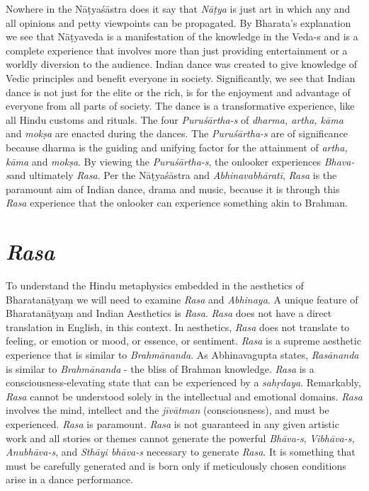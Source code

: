 Nowhere in the Nāṭyaśāstra does it say that \textit{Nāṭya} is just art in which any and all opinions and petty viewpoints can be propagated. By Bharata’s explanation we see that Nāṭyaveda is a manifestation of the knowledge in the Veda-s and is a complete experience that involves more than just providing entertainment or a worldly diversion to the audience. Indian dance was created to give knowledge of Vedic principles and benefit everyone in society. Significantly, we see that Indian dance is not just for the elite or the rich, is for the enjoyment and advantage of everyone from all parts of society. The dance is a transformative experience, like all Hindu customs and rituals. The four \textit{Puruśārtha-s} of \textit{dharma, artha, kāma }and \textit{mokṣa} are enacted during the dances. The \textit{Puruśārtha-s} are of significance because dharma is the guiding and unifying factor for the attainment of \textit{artha, kāma }and \textit{mokṣa}. By viewing the \textit{Puruśārtha-s}, the onlooker experiences \textit{Bhava-s}\break and ultimately \textit{Rasa}. Per the Nāṭyaśāstra and \textit{Abhinavabhāratī}, \textit{Rasa} is the paramount aim of Indian dance, drama and music, because it is through this \textit{Rasa} experience that the onlooker can experience something akin to Brahman.


\section*{\textit{Rasa}}

To understand the Hindu metaphysics embedded in the aesthetics of Bharatanāṭyaṃ we will need to examine \textit{Rasa} and \textit{Abhinaya}. A unique feature of Bharatanāṭyaṃ and Indian Aesthetics is \textit{Rasa}. \textit{Rasa} does not have a direct translation in English, in this context. In aesthetics, \textit{Rasa} does not translate to feeling, or emotion or mood, or essence, or sentiment. \textit{Rasa} is a supreme aesthetic experience that is similar to \textit{Brahmānanda}. As Abhinavagupta states, \textit{Rasānanda} is similar to \textit{Brahmānanda} - the bliss of Brahman knowledge. \textit{Rasa} is a consciousness-elevating state that can be experienced by a \textit{sahṛdaya}. Remarkably, \textit{Rasa} cannot be understood solely in the intellectual and emotional domains. \textit{Rasa} involves the mind, intellect and the \textit{jīvātman} (consciousness), and must be experienced. \textit{Rasa} is paramount. \textit{Rasa} is not guaranteed in any given artistic work and all stories or themes cannot generate the powerful \textit{Bhāva-s}, \textit{Vibhāva-s, Anubhāva-s}, and \textit{Sthāyi bhāva-s} necessary to generate \textit{Rasa}. It is something that must be carefully generated and is born only if meticulously chosen conditions arise in a dance performance.

